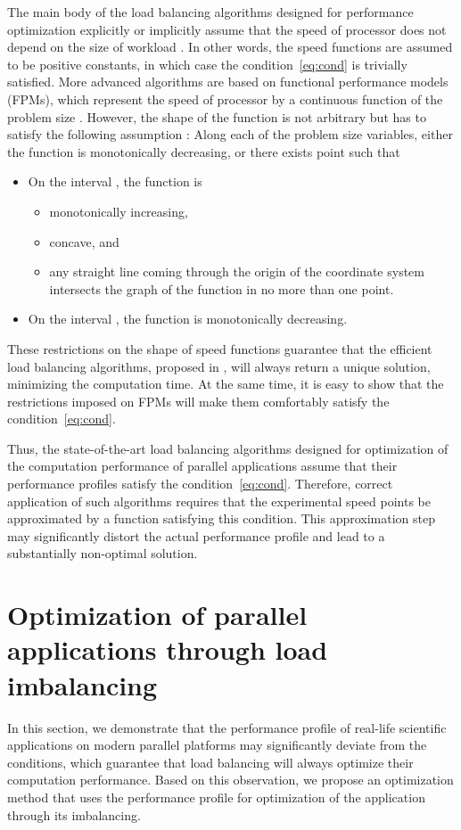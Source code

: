 \documentclass{acm_proc_article-sp}
\begin{document}
The main body of the load balancing algorithms designed for performance optimization explicitly or implicitly assume that the speed of processor does not depend on  the size of workload \cite{Fatica2009, Yang2010, Luk2009, cierniak, kalinov2001, plaza2011}. In other words, the speed functions   are assumed to be positive constants, in which case the condition~\ref{eq:cond} is trivially satisfied. More advanced algorithms are based on functional performance models (FPMs), which represent the speed of processor by a continuous function of the problem size \cite{twamley2005, ipdps2004}. However, the shape of the function is not  arbitrary but has to satisfy the following assumption \cite{ijhpca2007}: Along each of the problem size variables, either the function is monotonically decreasing, or there exists point  such that
\begin{itemize}
\item On the interval , the function is
\begin{itemize}
\item monotonically increasing,
\item concave, and
\item any straight line coming through the origin of the coordinate system intersects the graph of the function in no more than one point.
\end{itemize}
\item On the interval , the function is monotonically decreasing.
\end{itemize}
These restrictions on the shape of speed functions guarantee that the efficient load balancing algorithms, proposed in \cite{Ilic2011,Colaco,lastovetsky2007data, clarke2011dynamic, clarke2012column,alonazi2015}, will always return a unique solution, minimizing the computation time. At the same time, it is easy to show that the restrictions imposed on FPMs will make them comfortably satisfy the condition~\ref{eq:cond}. 

Thus, the state-of-the-art load balancing algorithms designed for optimization of the computation performance of parallel applications assume that their performance profiles satisfy the condition~\ref{eq:cond}.  Therefore, correct application of such algorithms requires that the experimental speed points be approximated by a function satisfying this condition. This approximation step may significantly distort the actual performance profile and lead to a substantially non-optimal solution. 

\section{Optimization of parallel applications through load imbalancing}
\label{sec:opt}
In this section, we demonstrate that the performance profile of real-life scientific applications on modern parallel platforms may significantly deviate from the conditions, which guarantee that load balancing will always optimize their computation performance. Based on this observation, we propose an optimization method that uses the performance profile for optimization of the application through its imbalancing.
\end{document}
